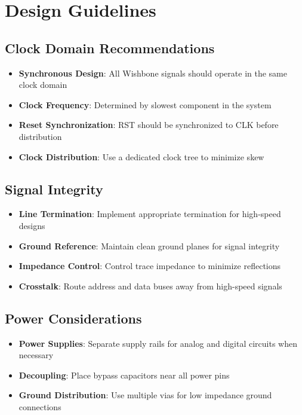 \documentclass[12pt,a4paper]{article}
\begin{document}
\section{Design Guidelines}

\subsection{Clock Domain Recommendations}

\begin{itemize}
    \item \textbf{Synchronous Design}: All Wishbone signals should operate in the same clock domain
    \item \textbf{Clock Frequency}: Determined by slowest component in the system
    \item \textbf{Reset Synchronization}: RST should be synchronized to CLK before distribution
    \item \textbf{Clock Distribution}: Use a dedicated clock tree to minimize skew
\end{itemize}

\subsection{Signal Integrity}

\begin{itemize}
    \item \textbf{Line Termination}: Implement appropriate termination for high-speed designs
    \item \textbf{Ground Reference}: Maintain clean ground planes for signal integrity
    \item \textbf{Impedance Control}: Control trace impedance to minimize reflections
    \item \textbf{Crosstalk}: Route address and data buses away from high-speed signals
\end{itemize}

\subsection{Power Considerations}

\begin{itemize}
    \item \textbf{Power Supplies}: Separate supply rails for analog and digital circuits when necessary
    \item \textbf{Decoupling}: Place bypass capacitors near all power pins
    \item \textbf{Ground Distribution}: Use multiple vias for low impedance ground connections
\end{itemize}
\end{document}
